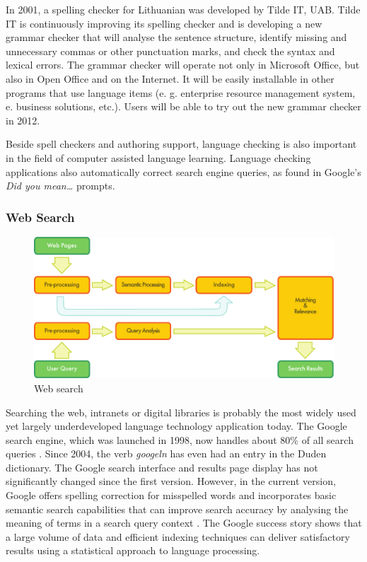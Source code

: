 \begin{multicols}{2}
In 2001, a spelling checker for Lithuanian was developed by Tilde IT, UAB. Tilde IT is continuously improving its spelling checker and is developing a new grammar checker that will analyse the sentence structure, identify missing and unnecessary commas or other punctuation marks, and check the syntax and lexical errors. The grammar checker will operate not only in Microsoft Office, but also in Open Office and on the Internet. It will be easily installable in other programs that use language items (e. g. enterprise resource management system, e. business solutions, etc.). Users will be able to try out the new grammar checker in 2012.

Beside spell checkers and authoring support, language checking is also important in the field of computer assisted language learning. Language checking applications also automatically correct search engine queries, as found in Google's \textit{Did you mean…} prompts.

\subsubsection{Web Search}

\begin{figure}[htb]
  \center
  \includegraphics[width=\textwidth]{../_media/english/web_search_architecture}
  \caption{Web search}
  \label{fig:websearcharch_en}
 \end{figure}

Searching the web, intranets or digital libraries is probably the most widely used yet largely underdeveloped language technology application today. The Google search engine, which was launched in 1998, now handles about 80\% of all search queries \cite{spi1}. Since 2004, the verb \textit{googeln} has even had an entry in the Duden dictionary. The Google search interface and results page display has not significantly changed since the first version. However, in the current version, Google offers spelling correction for misspelled words and incorporates basic semantic search capabilities that can improve search accuracy by analysing the meaning of terms in a search query context \cite{pc1}. The Google success story shows that a large volume of data and efficient indexing techniques can deliver satisfactory results using a statistical approach to language processing. 


\end{multicols}
